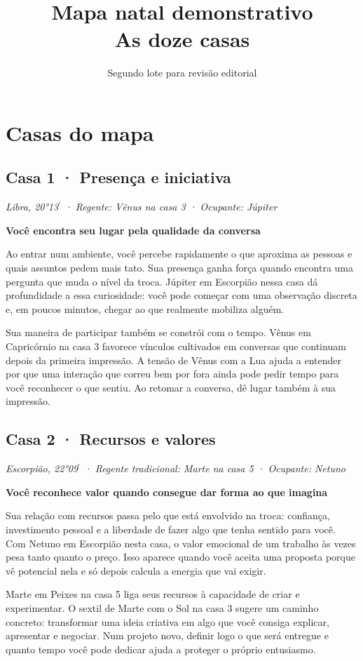 \documentclass[11pt,a4paper]{article}
\title{Mapa natal demonstrativo\\As doze casas}
\author{Segundo lote para revisão editorial}
\date{}
\newcommand{\leitura}[3]{\subsection{#1}\textit{#2}\par #3}
\newcommand{\subtituloleitura}[1]{\textbf{#1}\par\nopagebreak[4]}
\begin{document}
\maketitle
\section{Casas do mapa}

\leitura{Casa 1 · Presença e iniciativa}{Libra, 20°13\ensuremath{^{\prime}} · Regente: Vênus na casa 3 · Ocupante: Júpiter}{
\subtituloleitura{Você encontra seu lugar pela qualidade da conversa}
Ao entrar num ambiente, você percebe rapidamente o que aproxima as pessoas e quais assuntos pedem mais tato. Sua presença ganha força quando encontra uma pergunta que muda o nível da troca. Júpiter em Escorpião nessa casa dá profundidade a essa curiosidade: você pode começar com uma observação discreta e, em poucos minutos, chegar ao que realmente mobiliza alguém.

Sua maneira de participar também se constrói com o tempo. Vênus em Capricórnio na casa 3 favorece vínculos cultivados em conversas que continuam depois da primeira impressão. A tensão de Vênus com a Lua ajuda a entender por que uma interação que correu bem por fora ainda pode pedir tempo para você reconhecer o que sentiu. Ao retomar a conversa, dê lugar também à sua impressão.
}

\leitura{Casa 2 · Recursos e valores}{Escorpião, 22°09\ensuremath{^{\prime}} · Regente tradicional: Marte na casa 5 · Ocupante: Netuno}{
\subtituloleitura{Você reconhece valor quando consegue dar forma ao que imagina}
Sua relação com recursos passa pelo que está envolvido na troca: confiança, investimento pessoal e a liberdade de fazer algo que tenha sentido para você. Com Netuno em Escorpião nesta casa, o valor emocional de um trabalho às vezes pesa tanto quanto o preço. Isso aparece quando você aceita uma proposta porque vê potencial nela e só depois calcula a energia que vai exigir.

Marte em Peixes na casa 5 liga seus recursos à capacidade de criar e experimentar. O sextil de Marte com o Sol na casa 3 sugere um caminho concreto: transformar uma ideia criativa em algo que você consiga explicar, apresentar e negociar. Num projeto novo, definir logo o que será entregue e quanto tempo você pode dedicar ajuda a proteger o próprio entusiasmo.
}
\end{document}
